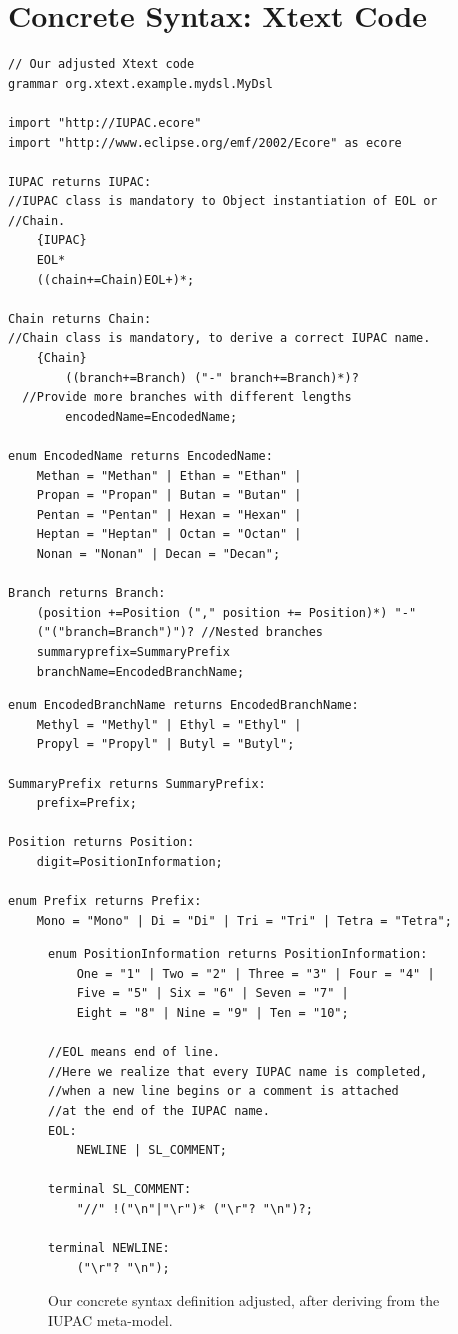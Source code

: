 \documentclass[
fontsize=11pt,
paper=a4,
abstract=true,
numbers=noenddot,
listof=totoc,
bibliography=totoc,
twoside,
open=right,
cleardoublepage=plain,
parskip=half+, %
BCOR=1cm, %
]{scrreprt}
\begin{document}
\section{Concrete Syntax: Xtext Code}\label{ss:ConcreteSyntax:Xtextcode}
 
\begin{lstlisting}[language=Xtext, numbers=none]
// Our adjusted Xtext code
grammar org.xtext.example.mydsl.MyDsl

import "http://IUPAC.ecore" 
import "http://www.eclipse.org/emf/2002/Ecore" as ecore

IUPAC returns IUPAC:
//IUPAC class is mandatory to Object instantiation of EOL or 
//Chain.   
	{IUPAC} 
	EOL*
	((chain+=Chain)EOL+)*;
	
Chain returns Chain:
//Chain class is mandatory, to derive a correct IUPAC name.
	{Chain} 
		((branch+=Branch) ("-" branch+=Branch)*)? 
  //Provide more branches with different lengths 
 		encodedName=EncodedName;
		
enum EncodedName returns EncodedName:
	Methan = "Methan" | Ethan = "Ethan" | 
    Propan = "Propan" | Butan = "Butan" | 
    Pentan = "Pentan" | Hexan = "Hexan" | 
	Heptan = "Heptan" | Octan = "Octan" | 
    Nonan = "Nonan" | Decan = "Decan";

Branch returns Branch:
	(position +=Position ("," position += Position)*) "-" 
	("("branch=Branch")")? //Nested branches       
	summaryprefix=SummaryPrefix
	branchName=EncodedBranchName;
\end{lstlisting}
\begin{lstlisting}[language=Xtext, numbers=none]
enum EncodedBranchName returns EncodedBranchName:
	Methyl = "Methyl" | Ethyl = "Ethyl" | 
    Propyl = "Propyl" | Butyl = "Butyl";

SummaryPrefix returns SummaryPrefix:
	prefix=Prefix;

Position returns Position:
	digit=PositionInformation;

enum Prefix returns Prefix:
	Mono = "Mono" | Di = "Di" | Tri = "Tri" | Tetra = "Tetra";
\end{lstlisting}
\begin{figure}[H]
\centering
\begin{lstlisting}[language=Xtext, numbers=none]
enum PositionInformation returns PositionInformation:
	One = "1" | Two = "2" | Three = "3" | Four = "4" | 
	Five = "5" | Six = "6" | Seven = "7" | 
	Eight = "8" | Nine = "9" | Ten = "10";
 
//EOL means end of line. 
//Here we realize that every IUPAC name is completed,
//when a new line begins or a comment is attached 
//at the end of the IUPAC name. 
EOL:
	NEWLINE | SL_COMMENT;

terminal SL_COMMENT:
	"//" !("\n"|"\r")* ("\r"? "\n")?;
	
terminal NEWLINE:
	("\r"? "\n");

\end{lstlisting}
\caption{Our concrete syntax definition adjusted, after deriving from the IUPAC meta-model.}
\label{fig:XtextCode}
\end{figure}
\end{document}
